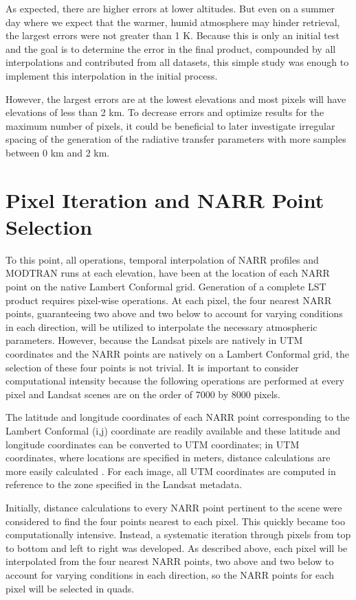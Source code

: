 \documentclass{book}
\begin{document}
As expected, there are higher errors at lower altitudes.  But even on a summer day where we expect that the warmer, humid atmosphere may hinder retrieval, the largest errors were not greater than 1 K.  Because this is only an initial test and the goal is to determine the error in the final product, compounded by all interpolations and contributed from all datasets, this simple study was enough to implement this interpolation in the initial process.

However, the largest errors are at the lowest elevations and most pixels will have elevations of less than 2 km.  To decrease errors and optimize results for the maximum number of pixels, it could be beneficial to later investigate irregular spacing of the generation of the radiative transfer parameters with more samples between 0 km and 2 km.

\section{Pixel Iteration and NARR Point Selection}
\label{sec:pixeliteration}

To this point, all operations, temporal interpolation of NARR profiles and MODTRAN runs at each elevation, have been at the location of each NARR point on the native Lambert Conformal grid.  Generation of a complete LST product requires pixel-wise operations.  At each pixel, the four nearest NARR points, guaranteeing two above and two below to account for varying conditions in each direction, will be utilized to interpolate the necessary atmospheric parameters.  However, because the Landsat pixels are natively in UTM coordinates and the NARR points are natively on a  Lambert Conformal grid, the selection of these four points is not trivial.  It is important to consider computational intensity because the following operations are performed at every pixel and Landsat scenes are on the order of 7000 by 8000 pixels.

The latitude and longitude coordinates of each NARR point corresponding to the Lambert Conformal (i,j) coordinate are readily available and these latitude and longitude coordinates can be converted to UTM coordinates; in UTM coordinates, where locations are specified in meters, distance calculations are more easily calculated \cite{narr_data}.  For each image, all UTM coordinates are computed in reference to the zone specified in the Landsat metadata.

Initially, distance calculations to every NARR point pertinent to the scene were considered to find the four points nearest to each pixel.  This quickly became too computationally intensive.  Instead, a systematic iteration through pixels from top to bottom and left to right was developed.  As described above, each pixel will be interpolated from the four nearest NARR points, two above and two below to account for varying conditions in each direction, so the NARR points for each pixel will be selected in quads.
\end{document}
